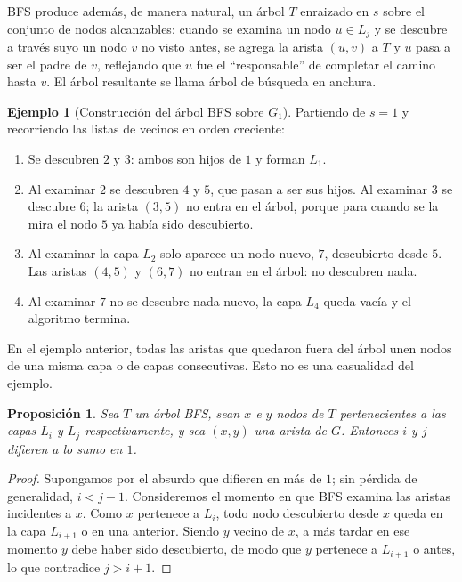 \documentclass[12pt, spanish, oneside, openany]{book}
\theoremstyle{uprightplain}
\newtheorem{proposicion}[teorema]{Proposición}
\theoremstyle{definition}
\newtheorem{ejemplo}[teorema]{Ejemplo}
\theoremstyle{remark}
\theoremstyle{definition}
\begin{document}
BFS produce además, de manera natural, un árbol $T$ enraizado en $s$ sobre el conjunto de nodos alcanzables: cuando se examina un nodo $u\in L_j$ y se descubre a través suyo un nodo $v$ no visto antes, se agrega la arista $(u,v)$ a $T$ y $u$ pasa a ser el padre de $v$, reflejando que $u$ fue el ``responsable'' de completar el camino hasta $v$. El árbol resultante se llama árbol de búsqueda en anchura.

\begin{ejemplo}[Construcción del árbol BFS sobre $G_1$]
\label{ej:bfs-arbol}
Partiendo de $s=1$ y recorriendo las listas de vecinos en orden creciente:
\begin{enumerate}
    \item Se descubren $2$ y $3$: ambos son hijos de $1$ y forman $L_1$.
    \item Al examinar $2$ se descubren $4$ y $5$, que pasan a ser sus hijos. Al examinar $3$ se descubre $6$; la arista $(3,5)$ no entra en el árbol, porque para cuando se la mira el nodo $5$ ya había sido descubierto.
    \item Al examinar la capa $L_2$ solo aparece un nodo nuevo, $7$, descubierto desde $5$. Las aristas $(4,5)$ y $(6,7)$ no entran en el árbol: no descubren nada.
    \item Al examinar $7$ no se descubre nada nuevo, la capa $L_4$ queda vacía y el algoritmo termina.
\end{enumerate}
\end{ejemplo}

En el ejemplo anterior, todas las aristas que quedaron fuera del árbol unen nodos de una misma capa o de capas consecutivas. Esto no es una casualidad del ejemplo.

\begin{proposicion}
\label{prop:bfs-capas-adyacentes}
Sea $T$ un árbol BFS, sean $x$ e $y$ nodos de $T$ pertenecientes a las capas $L_i$ y $L_j$ respectivamente, y sea $(x,y)$ una arista de $G$. Entonces $i$ y $j$ difieren a lo sumo en $1$.
\end{proposicion}
\begin{proof}
Supongamos por el absurdo que difieren en más de $1$; sin pérdida de generalidad, $i<j-1$. Consideremos el momento en que BFS examina las aristas incidentes a $x$. Como $x$ pertenece a $L_i$, todo nodo descubierto desde $x$ queda en la capa $L_{i+1}$ o en una anterior. Siendo $y$ vecino de $x$, a más tardar en ese momento $y$ debe haber sido descubierto, de modo que $y$ pertenece a $L_{i+1}$ o antes, lo que contradice $j>i+1$.
\end{proof}
\end{document}
